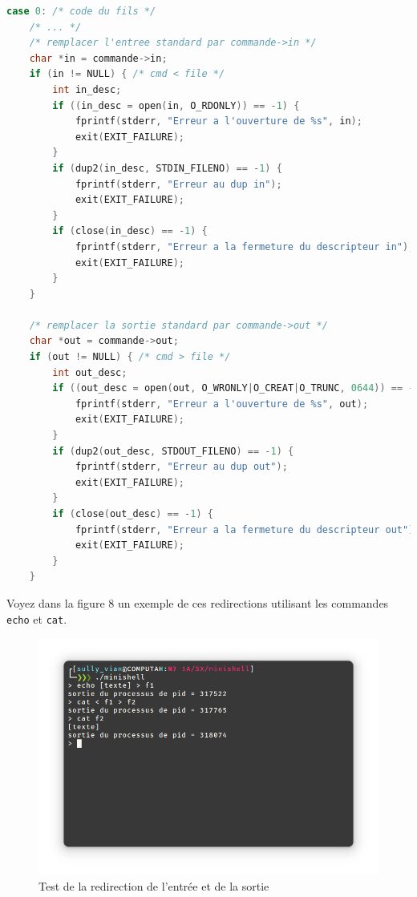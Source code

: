 \documentclass{article}
\begin{document}
\begin{lstlisting}[language=C, caption=gestion des redirections]
case 0: /* code du fils */
    /* ... */
    /* remplacer l'entree standard par commande->in */
    char *in = commande->in;
    if (in != NULL) { /* cmd < file */
        int in_desc;
        if ((in_desc = open(in, O_RDONLY)) == -1) {
            fprintf(stderr, "Erreur a l'ouverture de %s", in);
            exit(EXIT_FAILURE);
        }
        if (dup2(in_desc, STDIN_FILENO) == -1) {
            fprintf(stderr, "Erreur au dup in");
            exit(EXIT_FAILURE);
        }
        if (close(in_desc) == -1) {
            fprintf(stderr, "Erreur a la fermeture du descripteur in");
            exit(EXIT_FAILURE);
        }
    }

    /* remplacer la sortie standard par commande->out */
    char *out = commande->out;
    if (out != NULL) { /* cmd > file */
        int out_desc;
        if ((out_desc = open(out, O_WRONLY|O_CREAT|O_TRUNC, 0644)) == -1) {
            fprintf(stderr, "Erreur a l'ouverture de %s", out);
            exit(EXIT_FAILURE);
        }
        if (dup2(out_desc, STDOUT_FILENO) == -1) {
            fprintf(stderr, "Erreur au dup out");
            exit(EXIT_FAILURE);
        }
        if (close(out_desc) == -1) {
            fprintf(stderr, "Erreur a la fermeture du descripteur out");
            exit(EXIT_FAILURE);
        }
    }
\end{lstlisting}

Voyez dans la figure 8 un exemple de ces redirections utilisant les commandes \texttt{echo} et \texttt{cat}.

\begin{figure}[H]
    \centering
    \includegraphics[width=\textwidth]{./resources/E16.png}
    \caption{Test de la redirection de l'entrée et de la sortie}
\end{figure}
\end{document}

